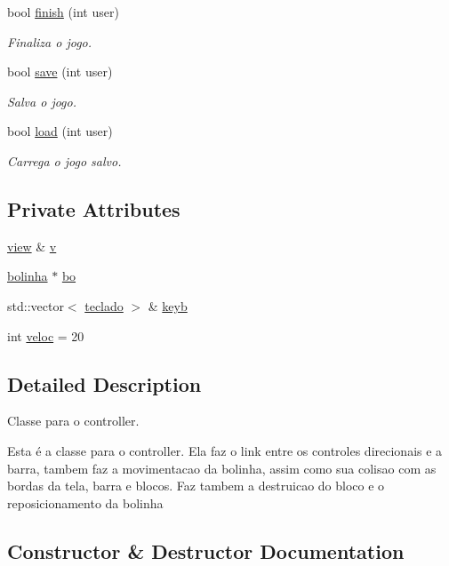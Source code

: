 \begin{DoxyCompactItemize}
bool \hyperlink{classcontroller_a632afa912bdc2e01eb44849e67e85f1c}{finish} (int user)
\begin{DoxyCompactList}\small\item\em Finaliza o jogo. \end{DoxyCompactList}\item 
bool \hyperlink{classcontroller_a668a92caf07126d9924e90bf1567f603}{save} (int user)
\begin{DoxyCompactList}\small\item\em Salva o jogo. \end{DoxyCompactList}\item 
bool \hyperlink{classcontroller_ae3b749cea3b4e45e1d078a0389ab95d4}{load} (int user)
\begin{DoxyCompactList}\small\item\em Carrega o jogo salvo. \end{DoxyCompactList}\end{DoxyCompactItemize}
\subsection*{Private Attributes}
\begin{DoxyCompactItemize}
\item 
\hyperlink{classview}{view} \& \hyperlink{classcontroller_a6ff845413a797ed4beff34d3cb6b7774}{v}
\item 
\hyperlink{classbolinha}{bolinha} $\ast$ \hyperlink{classcontroller_ae3e29aaa568c3d374b65416fd49649c5}{bo}
\item 
std\+::vector$<$ \hyperlink{classteclado}{teclado} $>$ \& \hyperlink{classcontroller_a00fc5e42acc7af64df818c8f0dfb4a90}{keyb}
\item 
int \hyperlink{classcontroller_ae1229353be5404b8decda1e8775292c4}{veloc} = 20
\end{DoxyCompactItemize}


\subsection{Detailed Description}
Classe para o controller. 

Esta é a classe para o controller. Ela faz o link entre os controles direcionais e a barra, tambem faz a movimentacao da bolinha, assim como sua colisao com as bordas da tela, barra e blocos. Faz tambem a destruicao do bloco e o reposicionamento da bolinha 

\subsection{Constructor \& Destructor Documentation}
